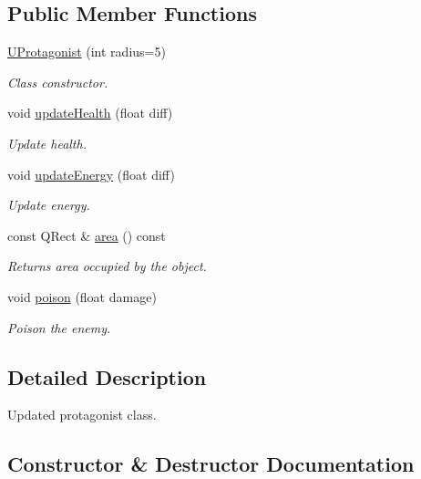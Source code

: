 \subsection*{Public Member Functions}
\begin{DoxyCompactItemize}
\item 
\hyperlink{classUProtagonist_aecc46a5d2ad349f141f7d623b6454816}{U\+Protagonist} (int radius=5)
\begin{DoxyCompactList}\small\item\em Class constructor. \end{DoxyCompactList}\item 
void \hyperlink{classUProtagonist_a453bac1fc034e1c15ad8d7bdac566421}{update\+Health} (float diff)
\begin{DoxyCompactList}\small\item\em Update health. \end{DoxyCompactList}\item 
void \hyperlink{classUProtagonist_a56f48e2a59eca29575cac673a03cbd69}{update\+Energy} (float diff)
\begin{DoxyCompactList}\small\item\em Update energy. \end{DoxyCompactList}\item 
const Q\+Rect \& \hyperlink{classUProtagonist_ae564263d78b9c1e15a27392376b1c2b3}{area} () const \hypertarget{classUProtagonist_ae564263d78b9c1e15a27392376b1c2b3}{}\label{classUProtagonist_ae564263d78b9c1e15a27392376b1c2b3}

\begin{DoxyCompactList}\small\item\em Returns area occupied by the object. \end{DoxyCompactList}\item 
void \hyperlink{classUProtagonist_a367f9c57f2b80bcc088d8cc2f88037a4}{poison} (float damage)
\begin{DoxyCompactList}\small\item\em Poison the enemy. \end{DoxyCompactList}\end{DoxyCompactItemize}


\subsection{Detailed Description}
Updated protagonist class. 

\subsection{Constructor \& Destructor Documentation}
